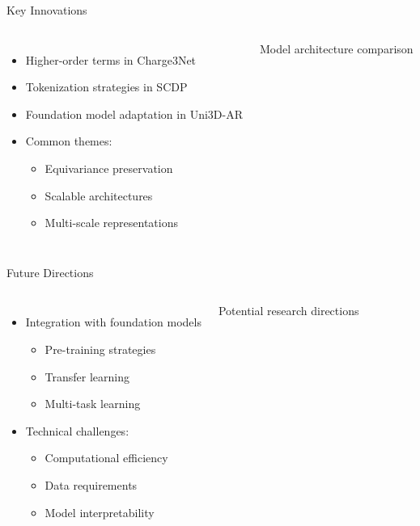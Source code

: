 \documentclass[aspectratio=169]{beamer}
\begin{document}
\begin{frame}{Key Innovations}
    \begin{columns}
        \begin{itemize}
            \item Higher-order terms in Charge3Net
            \item Tokenization strategies in SCDP
            \item Foundation model adaptation in Uni3D-AR
            \item Common themes:
            \begin{itemize}
                \item Equivariance preservation
                \item Scalable architectures
                \item Multi-scale representations
            \end{itemize}
        \end{itemize}
        Model architecture comparison
    \end{columns}
\end{frame}

\begin{frame}{Future Directions}
    \begin{columns}
        \begin{itemize}
            \item Integration with foundation models
            \begin{itemize}
                \item Pre-training strategies
                \item Transfer learning
                \item Multi-task learning
            \end{itemize}
            \item Technical challenges:
            \begin{itemize}
                \item Computational efficiency
                \item Data requirements
                \item Model interpretability
            \end{itemize}
        \end{itemize}
        Potential research directions
    \end{columns}
\end{frame}
\end{document}
